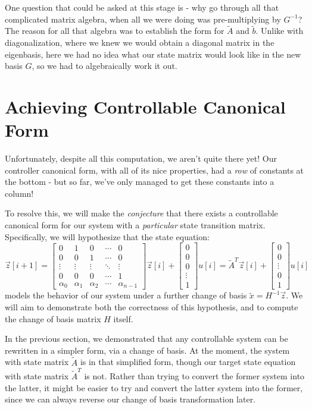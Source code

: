 \documentclass[letterpaper]{article}
\theoremstyle{remark}
\renewcommand{\tilde}[1]{\widetilde{#1}}
\newcommand{\mat}[1]{\ensuremath{\begin{bmatrix}#1\end{bmatrix}}}
\begin{document}
One question that could be asked at this stage is - why go through all that complicated matrix algebra, when all we were doing was pre-multiplying by $G^{-1}$? The reason for all that algebra was to establish the form for $\tilde{A}$ and $\tilde{b}$. Unlike with diagonalization, where we knew we would obtain a diagonal matrix in the eigenbasis, here we had no idea what our state matrix would look like in the new basis $G$, so we had to algebraically work it out.

\section{Achieving Controllable Canonical Form}
Unfortunately, despite all this computation, we aren't quite there yet! Our controller canonical form, with all of its nice properties, had a \emph{row} of constants at the bottom - but so far, we've only managed to get these constants into a column! 

To resolve this, we will make the \emph{conjecture} that there exists a controllable canonical form for our system with a \emph{particular} state transition matrix. Specifically, we will hypothesize that the state equation:
\[
    \vec{z}[i+1] = \mat{
    0 & 1 & 0 & \cdots & 0 \\ 
    0 & 0 & 1 & \cdots & 0 \\
    \vdots & \vdots & \vdots & \ddots & \vdots \\
    0 & 0 & 0 & \cdots & 1 \\
    \alpha_0 & \alpha_1 & \alpha_2 & \cdots & \alpha_{n - 1}
    } \vec{z}[i] + \mat{0 \\ 0 \\ 0 \\ \vdots \\ 1} u[i] = \tilde{A}^T\vec{z}[i] + \mat{0 \\ 0 \\ \vdots \\ 0 \\ 1} u[i]
\]
models the behavior of our system under a further change of basis $\tilde{x} = H^{-1}\vec{z}$. We will aim to demonstrate both the correctness of this hypothesis, and to compute the change of basis matrix $H$ itself.

In the previous section, we demonstrated that any controllable system can be rewritten in a simpler form, via a change of basis. At the moment, the system with state matrix $\tilde{A}$ is in that simplified form, though our target state equation with state matrix $\tilde{A}^T$ is not. Rather than trying to convert the former system into the latter, it might be easier to try and convert the latter system into the former, since we can always reverse our change of basis transformation later.
\end{document}
